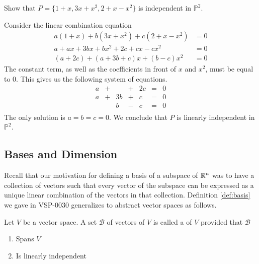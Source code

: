 \documentclass{ximera}
\begin{document}
\begin{example}\label{ex:polyindset} 
Show that $P=\{1 + x, 3x + x^{2}, 2 + x - x^{2}\}$ is independent in $\mathbb{P}^{2}$.

\begin{explanation}
Consider the linear combination equation
\begin{align*}
a(1 + x) + b(3x + x^2) + c(2 + x - x^2) &= 0\\
a+ax+3bx+bx^2+2c+cx-cx^2&=0\\
(a+2c)+(a+3b+c)x+(b-c)x^2&=0
\end{align*}
The constant term, as well as the coefficients in front of $x$ and $x^2$, must be equal to $0$.  This gives us the following system of equations.
\begin{equation*}
\begin{array}{rlrlrcr}
	a & + &      & + & 2c & = & 0 \\
	a & + & 3b & + &  c & = & 0 \\
	    &   &  b & - &  c & = & 0 \\
\end{array}
\end{equation*}
The only solution is $a = b = c = 0$.  We conclude that $P$ is linearly independent in $\mathbb{P}^2$.
\end{explanation}
\end{example}

\subsection*{Bases and Dimension}

Recall that our motivation for defining a basis of a subspace of $\mathbb{R}^n$ was to have a collection of vectors such that every vector of the subspace can be expressed as a unique linear combination of the vectors in that collection.  Definition \ref{def:basis} we gave in VSP-0030 generalizes to abstract vector spaces as follows.

\begin{definition}\label{def:basisabstract}
Let $V$ be a vector space.  A set $\mathcal{B}$ of vectors of $V$ is called a  of $V$  provided that $\mathcal{B}$
\begin{enumerate}
\item \label{item:defbasis1abstract}
Spans $V$
\item \label{item:defbasis2abstract}
Is linearly independent
\end{enumerate}
\end{definition}
\end{document}
